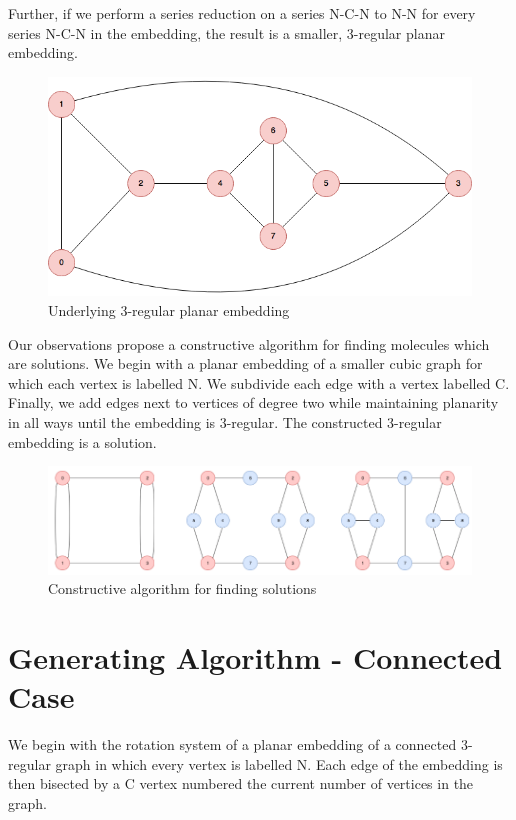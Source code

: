 \documentclass[12pt]{article}
\begin{document}
Further, if we perform a series reduction on a series N-C-N to N-N for every series N-C-N in the embedding, the result is a smaller, 3-regular planar embedding.

\begin{figure}[H]
    \includegraphics[scale=.4,center]{Figure1}
    \caption{Underlying 3-regular planar embedding}
    \label{Figure8}
\end{figure}

Our observations propose a constructive algorithm for finding molecules which are solutions. We begin with a planar embedding of a smaller cubic graph for which each vertex is labelled N. We subdivide each edge with a vertex labelled C. Finally, we add edges next to vertices of degree two while maintaining planarity in all ways until the embedding is 3-regular. The constructed 3-regular embedding is a solution.

\begin{figure}[H]
    \includegraphics[scale=.4,center]{Figure9}
    \caption{Constructive algorithm for finding solutions}
    \label{Figure9}
\end{figure}

\section{Generating Algorithm - Connected Case}
We begin with the rotation system of a planar embedding of a connected 3-regular graph in which every vertex is labelled N. Each edge of the embedding is then bisected by a C vertex numbered the current number of vertices in the graph.
\end{document}
